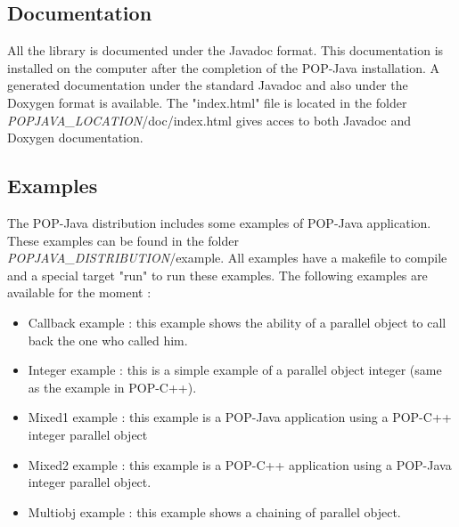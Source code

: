 \subsection{Documentation}
All the library is documented under the Javadoc format. This documentation is installed on the computer after the completion of the POP-Java installation. A generated documentation under the standard Javadoc and also under the Doxygen format is available. The "index.html" file is located in the folder \textit{POPJAVA\_LOCATION}/doc/index.html gives acces to both Javadoc and Doxygen documentation.

\subsection{Examples}
The POP-Java distribution includes some examples of POP-Java application. These examples can be found in the folder \textit{POPJAVA\_DISTRIBUTION}/example. All examples have a makefile to compile and a special target "run" to run these examples. The following examples are available for the moment : 

\begin{itemize}
\item Callback example : this example shows the ability of a parallel object to call back the one who called him.
\item Integer example : this is a simple example of a parallel object integer (same as the example in POP-C++).
\item Mixed1 example : this example is a POP-Java application using a POP-C++ integer parallel object
\item Mixed2 example : this example is a POP-C++ application using a POP-Java integer parallel object.
\item Multiobj example : this example shows a chaining of parallel object.
\end{itemize}
